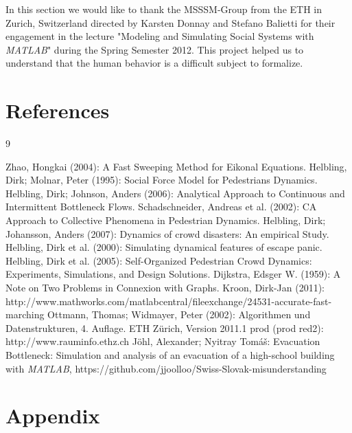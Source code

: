 \documentclass[11pt]{article}
\begin{document}
In this section we would like to thank the MSSSM-Group from the ETH in Zurich, Switzerland
directed by Karsten Donnay and Stefano Balietti for their engagement in the lecture
"Modeling and Simulating Social Systems with \textit{MATLAB}" during the Spring Semester 2012.
This project helped us to understand that the human behavior is a difficult subject to formalize.



\section{References}

\begin{thebibliography} {9}
	
	 Zhao, Hongkai (2004): A Fast Sweeping Method for Eikonal Equations.
	 Helbling, Dirk; Molnar, Peter (1995): Social Force Model for Pedestrians Dynamics.
	 Helbling, Dirk; Johnson, Anders (2006): Analytical Approach to Continuous and Intermittent Bottleneck Flows.
	 Schadschneider, Andreas et al. (2002): CA Approach to Collective Phenomena in Pedestrian Dynamics.	
	 Helbling, Dirk; Johansson, Anders (2007): Dynamics of crowd disasters: An empirical Study.
	 Helbling, Dirk et al. (2000): Simulating dynamical features of escape panic.
	 Helbling, Dirk et al. (2005): Self-Organized Pedestrian Crowd Dynamics: Experiments, Simulations, and Design Solutions.
	 Dijkstra, Edsger W. (1959): A Note on Two Problems in Connexion with Graphs.
	 Kroon, Dirk-Jan (2011): http://www.mathworks.com/matlabcentral/fileexchange/24531-accurate-fast-marching
	 Ottmann, Thomas; Widmayer, Peter (2002): Algorithmen und Datenstrukturen, 4. Auflage.
	 ETH Zürich, Version 2011.1 prod (prod red2): http://www.rauminfo.ethz.ch
	 Jöhl, Alexander; Nyitray Tom\'{a}\v{s}: Evacuation Bottleneck: Simulation and analysis of an evacuation of a high-school building with \textit{MATLAB}, https://github.com/jjoolloo/Swiss-Slovak-misunderstanding

\end{thebibliography}


\section{Appendix}
\end{document}
